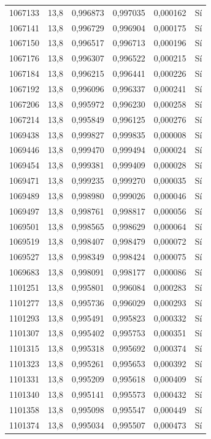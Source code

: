 \begin{longtable}{lccccc}
1067133 & 13,8 & 0,996873 & 0,997035 & 0,000162 & Sí \\
1067141 & 13,8 & 0,996729 & 0,996904 & 0,000175 & Sí \\
1067150 & 13,8 & 0,996517 & 0,996713 & 0,000196 & Sí \\
1067176 & 13,8 & 0,996307 & 0,996522 & 0,000215 & Sí \\
1067184 & 13,8 & 0,996215 & 0,996441 & 0,000226 & Sí \\
1067192 & 13,8 & 0,996096 & 0,996337 & 0,000241 & Sí \\
1067206 & 13,8 & 0,995972 & 0,996230 & 0,000258 & Sí \\
1067214 & 13,8 & 0,995849 & 0,996125 & 0,000276 & Sí \\
1069438 & 13,8 & 0,999827 & 0,999835 & 0,000008 & Sí \\
1069446 & 13,8 & 0,999470 & 0,999494 & 0,000024 & Sí \\
1069454 & 13,8 & 0,999381 & 0,999409 & 0,000028 & Sí \\
1069471 & 13,8 & 0,999235 & 0,999270 & 0,000035 & Sí \\
1069489 & 13,8 & 0,998980 & 0,999026 & 0,000046 & Sí \\
1069497 & 13,8 & 0,998761 & 0,998817 & 0,000056 & Sí \\
1069501 & 13,8 & 0,998565 & 0,998629 & 0,000064 & Sí \\
1069519 & 13,8 & 0,998407 & 0,998479 & 0,000072 & Sí \\
1069527 & 13,8 & 0,998349 & 0,998424 & 0,000075 & Sí \\
1069683 & 13,8 & 0,998091 & 0,998177 & 0,000086 & Sí \\
1101251 & 13,8 & 0,995801 & 0,996084 & 0,000283 & Sí \\
1101277 & 13,8 & 0,995736 & 0,996029 & 0,000293 & Sí \\
1101293 & 13,8 & 0,995491 & 0,995823 & 0,000332 & Sí \\
1101307 & 13,8 & 0,995402 & 0,995753 & 0,000351 & Sí \\
1101315 & 13,8 & 0,995318 & 0,995692 & 0,000374 & Sí \\
1101323 & 13,8 & 0,995261 & 0,995653 & 0,000392 & Sí \\
1101331 & 13,8 & 0,995209 & 0,995618 & 0,000409 & Sí \\
1101340 & 13,8 & 0,995141 & 0,995573 & 0,000432 & Sí \\
1101358 & 13,8 & 0,995098 & 0,995547 & 0,000449 & Sí \\
1101374 & 13,8 & 0,995034 & 0,995507 & 0,000473 & Sí \\

\end{longtable}
